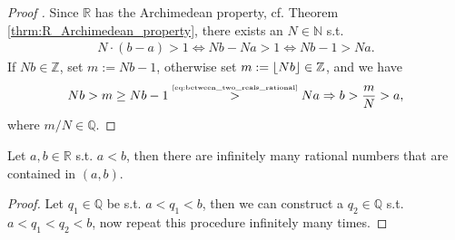 \begin{proof}[Proof \cite{421600,3434503}]
	Since $\mathbb R$ has the Archimedean property, cf. Theorem \ref{thrm:R_Archimedean_property}, there exists an $N\in\mathbb N$ s.t. 
	\begin{align}\label{eq:between_two_reals_rational}
		N \cdot (b - a) > 1\Leftrightarrow Nb - Na > 1\Leftrightarrow Nb - 1 > Na.
	\end{align} 
	If $Nb\in\mathbb Z$, set $m := Nb - 1$, otherwise set $m := \lfloor Nb \rfloor \in\mathbb Z$, and we have
	$$Nb > m \geq Nb - 1 \overset{\tiny\eqref{eq:between_two_reals_rational}}{>} Na\Rightarrow b > \frac{m}{N} > a,$$ where $m/N\in\mathbb Q$.
\end{proof}

\begin{corollary}
	Let $a, b\in\mathbb R$ s.t. $a < b$, then there are infinitely many rational numbers that are contained in $(a, b)$.
\end{corollary}

\begin{proof}
	Let $q_1\in\mathbb Q$ be s.t. $a < q_1 < b$, then we can construct a $q_2\in\mathbb Q$ s.t. $a < q_1 < q_2 < b$, now repeat this procedure infinitely many times.
\end{proof}
